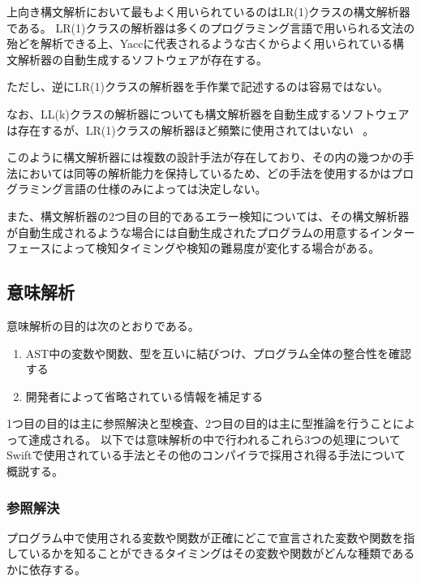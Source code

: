
上向き構文解析において最もよく用いられているのはLR(1)クラスの構文解析器である。
LR(1)クラスの解析器は多くのプログラミング言語で用いられる文法の殆どを解析できる上、Yaccに代表されるような古くからよく用いられている構文解析器の自動生成するソフトウェアが存在する。

ただし、逆にLR(1)クラスの解析器を手作業で記述するのは容易ではない。

なお、LL(k)クラスの解析器についても構文解析器を自動生成するソフトウェアは存在するが、LR(1)クラスの解析器ほど頻繁に使用されてはいない ~\cite{antlr}。

\vspace{2em}

このように構文解析器には複数の設計手法が存在しており、その内の幾つかの手法においては同等の解析能力を保持しているため、どの手法を使用するかはプログラミング言語の仕様のみによっては決定しない。

また、構文解析器の2つ目の目的であるエラー検知については、その構文解析器が自動生成されるような場合には自動生成されたプログラムの用意するインターフェースによって検知タイミングや検知の難易度が変化する場合がある。

\subsection{意味解析}
\label{refinement:structure:sema}

意味解析の目的は次のとおりである。

\begin{enumerate}
    \item AST中の変数や関数、型を互いに結びつけ、プログラム全体の整合性を確認する
    \item 開発者によって省略されている情報を補足する
\end{enumerate}

1つ目の目的は主に参照解決と型検査、2つ目の目的は主に型推論を行うことによって達成される。
以下では意味解析の中で行われるこれら3つの処理についてSwiftで使用されている手法とその他のコンパイラで採用され得る手法について概説する。

\subsubsection{参照解決}

プログラム中で使用される変数や関数が正確にどこで宣言された変数や関数を指しているかを知ることができるタイミングはその変数や関数がどんな種類であるかに依存する。

